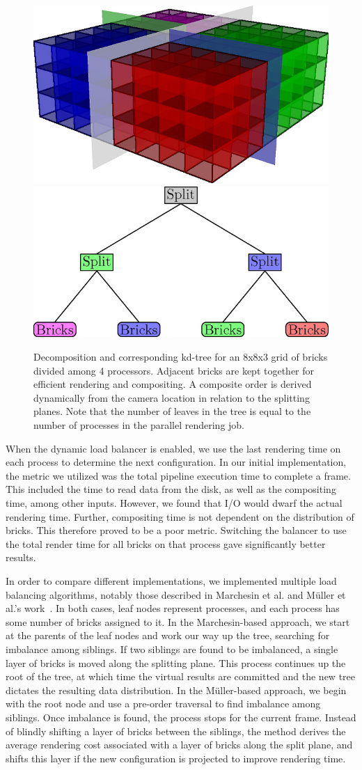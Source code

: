 \begin{figure}
  \includegraphics[width=0.49\linewidth]{images/multiscale/bricks.jpg}
  \includegraphics[width=0.49\linewidth]{images/multiscale/tree.jpg}
  \caption{Decomposition and corresponding kd-tree for an 8x8x3 grid
  of bricks divided among 4 processors.  Adjacent bricks are kept
  together for efficient rendering and compositing.  A composite order
  is derived dynamically from the camera location in relation to the
  splitting planes.  Note that the number of leaves in the tree is
  equal to the number of processes in the parallel rendering job.}
  \label{fig:decomposition}
\end{figure}

When the dynamic load balancer is enabled, we use the last rendering
time on each process to determine the next configuration.  In our
initial implementation, the metric we utilized was the total pipeline
execution time to complete a frame.  This included the time to read
data from the disk, as well as the compositing time, among other
inputs.  However, we found that I/O would dwarf the actual rendering
time.  Further, compositing time is not dependent on the distribution
of bricks.  This therefore proved to be a poor metric.  Switching the
balancer to use the total render time for all bricks on that process
gave significantly better results.

In order to compare different implementations, we implemented multiple
load balancing algorithms, notably those described in Marchesin et al.
and M\"uller et al.'s work~\cite{MMD06, MSE06}.  In both cases, leaf
nodes represent processes, and each process has some number of bricks
assigned to it.  In the Marchesin-based approach, we start at the
parents of the leaf nodes and work our way up the tree, searching for
imbalance among siblings.  If two siblings are found to be imbalanced,
a single layer of bricks is moved along the splitting plane.  This
process continues up the root of the tree, at which time the virtual
results are committed and the new tree dictates the resulting data
distribution.  In the M\"uller-based approach, we begin with the root
node and use a pre-order traversal to find imbalance among siblings.
Once imbalance is found, the process stops for the current frame.
Instead of blindly shifting a layer of bricks between the siblings,
the method derives the average rendering cost associated with a layer
of bricks along the split plane, and shifts this layer if the new
configuration is projected to improve rendering time.

